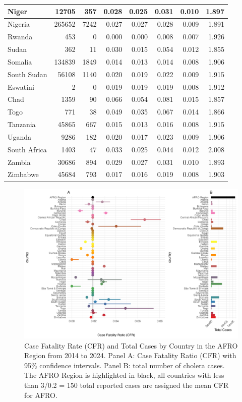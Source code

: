 \documentclass[
]{book}
\begin{document}
\begin{table}
\begin{tabular}[t]{l|r|r|r|r|r|r|r}
\hline
Niger & 12705 & 357 & 0.028 & 0.025 & 0.031 & 0.010 & 1.897\\
\hline
Nigeria & 265652 & 7242 & 0.027 & 0.027 & 0.028 & 0.009 & 1.891\\
\hline
Rwanda & 453 & 0 & 0.000 & 0.000 & 0.008 & 0.007 & 1.926\\
\hline
Sudan & 362 & 11 & 0.030 & 0.015 & 0.054 & 0.012 & 1.855\\
\hline
Somalia & 134839 & 1849 & 0.014 & 0.013 & 0.014 & 0.008 & 1.906\\
\hline
South Sudan & 56108 & 1140 & 0.020 & 0.019 & 0.022 & 0.009 & 1.915\\
\hline
Eswatini & 2 & 0 & 0.019 & 0.019 & 0.019 & 0.008 & 1.912\\
\hline
Chad & 1359 & 90 & 0.066 & 0.054 & 0.081 & 0.015 & 1.857\\
\hline
Togo & 771 & 38 & 0.049 & 0.035 & 0.067 & 0.014 & 1.866\\
\hline
Tanzania & 45865 & 667 & 0.015 & 0.013 & 0.016 & 0.008 & 1.915\\
\hline
Uganda & 9286 & 182 & 0.020 & 0.017 & 0.023 & 0.009 & 1.906\\
\hline
South Africa & 1403 & 47 & 0.033 & 0.025 & 0.044 & 0.012 & 2.008\\
\hline
Zambia & 30686 & 894 & 0.029 & 0.027 & 0.031 & 0.010 & 1.893\\
\hline
Zimbabwe & 45684 & 793 & 0.017 & 0.016 & 0.019 & 0.008 & 1.903\\
\hline
\end{tabular}
\end{table}

\begin{figure}

{\centering \includegraphics[width=1\linewidth]{figures/case_fatality_ratio_and_cases_total_by_country} 

}

\caption{Case Fatality Rate (CFR) and Total Cases by Country in the AFRO Region from 2014 to 2024. Panel A: Case Fatality Ratio (CFR) with 95\% confidence intervals. Panel B: total number of cholera cases. The AFRO Region is highlighted in black, all countries with less than 3/0.2 = 150 total reported cases are assigned the mean CFR for AFRO.}\label{fig:cfr-cases}
\end{figure}
\end{document}

